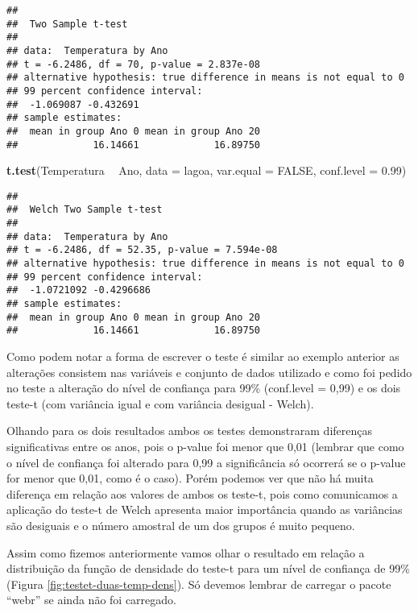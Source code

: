 \documentclass[]{book}
\newenvironment{Shaded}{\begin{snugshade}}{\end{snugshade}}
\newcommand{\DataTypeTok}[1]{\textcolor[rgb]{0.13,0.29,0.53}{#1}}
\newcommand{\FloatTok}[1]{\textcolor[rgb]{0.00,0.00,0.81}{#1}}
\newcommand{\KeywordTok}[1]{\textcolor[rgb]{0.13,0.29,0.53}{\textbf{#1}}}
\newcommand{\NormalTok}[1]{#1}
\newcommand{\OperatorTok}[1]{\textcolor[rgb]{0.81,0.36,0.00}{\textbf{#1}}}
\newcommand{\OtherTok}[1]{\textcolor[rgb]{0.56,0.35,0.01}{#1}}
\newcommand{\StringTok}[1]{\textcolor[rgb]{0.31,0.60,0.02}{#1}}
\begin{document}
\begin{verbatim}
## 
##  Two Sample t-test
## 
## data:  Temperatura by Ano
## t = -6.2486, df = 70, p-value = 2.837e-08
## alternative hypothesis: true difference in means is not equal to 0
## 99 percent confidence interval:
##  -1.069087 -0.432691
## sample estimates:
##  mean in group Ano 0 mean in group Ano 20 
##             16.14661             16.89750
\end{verbatim}

\begin{Shaded}
\begin{Highlighting}[]
\KeywordTok{t.test}\NormalTok{(Temperatura }\OperatorTok{~}\StringTok{ }\NormalTok{Ano, }
       \DataTypeTok{data =}\NormalTok{ lagoa,}
       \DataTypeTok{var.equal =} \OtherTok{FALSE}\NormalTok{,}
       \DataTypeTok{conf.level =} \FloatTok{0.99}\NormalTok{)}
\end{Highlighting}
\end{Shaded}

\begin{verbatim}
## 
##  Welch Two Sample t-test
## 
## data:  Temperatura by Ano
## t = -6.2486, df = 52.35, p-value = 7.594e-08
## alternative hypothesis: true difference in means is not equal to 0
## 99 percent confidence interval:
##  -1.0721092 -0.4296686
## sample estimates:
##  mean in group Ano 0 mean in group Ano 20 
##             16.14661             16.89750
\end{verbatim}

Como podem notar a forma de escrever o teste é similar ao exemplo anterior as alterações consistem nas variáveis e conjunto de dados utilizado e como foi pedido no teste a alteração do nível de confiança para 99\% (conf.level = 0,99) e os dois teste-t (com variância igual e com variância desigual - Welch).

Olhando para os dois resultados ambos os testes demonstraram diferenças significativas entre os anos, pois o p-value foi menor que 0,01 (lembrar que como o nível de confiança foi alterado para 0,99 a significância só ocorrerá se o p-value for menor que 0,01, como é o caso). Porém podemos ver que não há muita diferença em relação aos valores de ambos os teste-t, pois como comunicamos a aplicação do teste-t de Welch apresenta maior importância quando as variâncias são desiguais e o número amostral de um dos grupos é muito pequeno.

Assim como fizemos anteriormente vamos olhar o resultado em relação a distribuição da função de densidade do teste-t para um nível de confiança de 99\% (Figura \ref{fig:testet-duas-temp-dens}). Só devemos lembrar de carregar o pacote ``webr'' se ainda não foi carregado.
\end{document}
